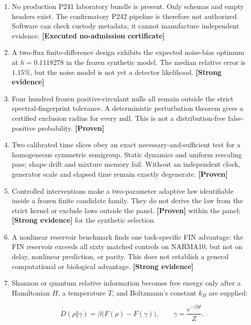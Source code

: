 \documentclass[11pt,a4paper,openany]{report}
\newcommand{\statusProven}{\textcolor{fingreen}{[Proven]}}
\newcommand{\statusStrong}{\textcolor{finblue}{[Strong evidence]}}
\begin{document}
\begin{enumerate}
\item 
No production P241 laboratory bundle is present. Only schemas and empty headers exist. The confirmatory P242 pipeline is therefore not authorized. Software can check custody metadata; it cannot manufacture independent evidence. \textbf{[Executed no-admission certificate]}

\item 
A two-flux finite-difference design exhibits the expected noise-bias optimum at \(h=0.1118278\) in the frozen synthetic model. The median relative error is \(1.15\%\), but the noise model is not yet a detector likelihood. \textbf{\statusStrong{}}

\item 
Four hundred frozen positive-circulant nulls all remain outside the strict spectral-fingerprint tolerance. A deterministic perturbation theorem gives a certified exclusion radius for every null. This is not a distribution-free false-positive probability. \textbf{\statusProven{}}

\item 
Two calibrated time slices obey an exact necessary-and-sufficient test for a homogeneous symmetric semigroup. Static dynamics and uniform rescaling pass; shape drift and mixture memory fail. Without an independent clock, generator scale and elapsed time remain exactly degenerate. \textbf{\statusProven{}}

\item 
Controlled interventions make a two-parameter adaptive law identifiable inside a frozen finite candidate family. They do not derive the law from the strict kernel or exclude laws outside the panel. \textbf{\statusProven{}} within the panel; \textbf{\statusStrong{}} for the synthetic selection.

\item 
A nonlinear reservoir benchmark finds one task-specific FIN advantage: the FIN reservoir exceeds all sixty matched controls on NARMA10, but not on delay, nonlinear prediction, or parity. This does not establish a general computational or biological advantage. \textbf{\statusStrong{}}

\item 
Shannon or quantum relative information becomes free energy only after a Hamiltonian \(H\), a temperature \(T\), and Boltzmann's constant \(k_B\) are supplied:

\[
    D(\rho\Vert\gamma)
    =
    \beta\bigl(F(\rho)-F(\gamma)\bigr),
    \qquad
    \gamma=\frac{e^{-\beta H}}{Z}.
    \]


\end{enumerate}
\end{document}
